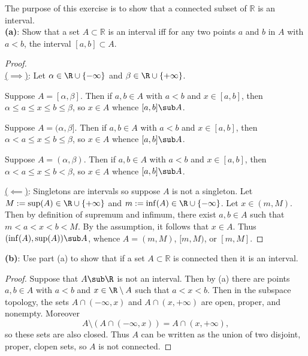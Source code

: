 \documentclass[12pt]{article}
\begin{document}
\begin{homeworkProblem}
The purpose of this exercise is to show that a connected subset of $\mathbb{R}$ is an interval.  \\

\textbf{(a)}: Show that a set $A \subset \mathbb{R}$ is an interval iff for any two points $a$ and $b$ in $A$ with $a < b$, the interval $[a,b] \subset A$.  

\begin{proof}\,\\
  \underline{($ \implies $)}: Let $ \alpha\in \R\cup\{-\infty\} $ and $ \beta\in \R\cup\{+\infty\} $.


  Suppose $ A = [\alpha,\beta] $. Then if $ a,b\in A $ with $ a<b $ and $ x\in [a,b] $, then $ \alpha\leq a \leq x \leq b \leq \beta $, so $ x\in A $ whence $ [a,b]\sub A $. 

  Suppose $ A = (\alpha, \beta] $. Then if $ a,b\in A$ with $ a<b $ and $ x\in [a,b] $, then $ \alpha<a\leq x\leq b \leq \beta $, so $ x\in A $ whence $ [a,b] \sub A $.

  Suppose $ A = (\alpha, \beta) $. Then if $ a,b\in A$ with $ a<b $ and $ x\in [a,b] $, then $ \alpha<a\leq x\leq b < \beta $, so $ x\in A $ whence $ [a,b] \sub A $.

  \underline{($ \impliedby $)}: Singletons are intervals so suppose $ A $ is not a singleton. Let $ M:= \sup(A)\in \R\cup\{+\infty\} $ and $ m:=\inf(A)\in \R\cup\{-\infty\} $. Let $ x\in (m, M) $. Then by definition of supremum and infimum, there exist $ a,b\in A $ such that $ m<a<x<b<M $. By the assumption, it follows that $ x\in A $. Thus $ (\inf(A), \sup(A))\sub A $, whence $ A = (m,M) $, $ [m,M) $, or $ [m,M] $.

\end{proof}


\textbf{(b)}: Use part (a) to show that if a set $A \subset \mathbb{R}$ is connected then it is an interval.  

\begin{proof} 
 Suppose that $ A \sub \R$ is not an interval. Then by (a) there are points $ a,b\in A $ with $ a<b $ and $ x\in\R\setminus A $ such that $ a<x<b $. Then in the subspace topology, the sets $ A\cap (-\infty,x) $ and $ A\cap(x,+\infty) $ are  open, proper, and nonempty.
 Moreover 
 \[
   A\setminus (A\cap(-\infty,x)) = A\cap (x,+\infty),
 \]
 so these sets are also closed. Thus $ A $ can be written as the union of two disjoint, proper, clopen sets, so $ A $ is not connected.
\end{proof}

\end{homeworkProblem}
\end{document}
